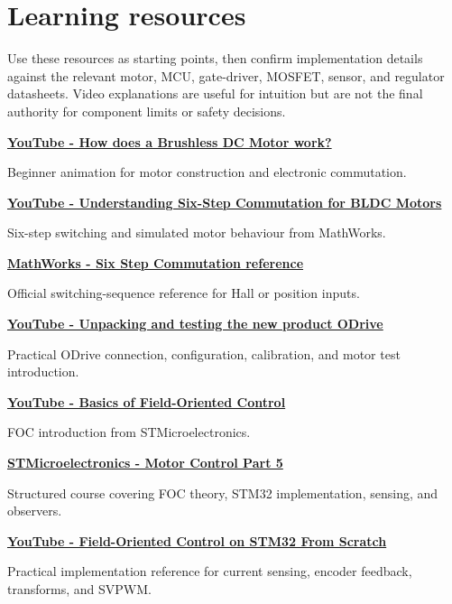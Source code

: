 \documentclass[11pt,a4paper]{article}
\newcommand{\Resource}[3]{%
  \begin{resourcebox}
    \href{#2}{\textbf{\color{DARESTeal}#1}}\par
    {\small #3}
  \end{resourcebox}
}
\begin{document}
\section{Learning resources}

Use these resources as starting points, then confirm implementation details
against the relevant motor, MCU, gate-driver, MOSFET, sensor, and regulator
datasheets. Video explanations are useful for intuition but are not the final
authority for component limits or safety decisions.

\Resource
  {YouTube - How does a Brushless DC Motor work?}
  {https://www.youtube.com/watch?v=Hw1q-jbhPzc}
  {Beginner animation for motor construction and electronic commutation.}

\Resource
  {YouTube - Understanding Six-Step Commutation for BLDC Motors}
  {https://www.youtube.com/watch?v=WYJWdMV3YMs}
  {Six-step switching and simulated motor behaviour from MathWorks.}

\Resource
  {MathWorks - Six Step Commutation reference}
  {https://www.mathworks.com/help/mcb/ref/sixstepcommutation.html}
  {Official switching-sequence reference for Hall or position inputs.}

\Resource
  {YouTube - Unpacking and testing the new product ODrive}
  {https://www.youtube.com/watch?v=DVN25PbMfDE\&list=PLc2RScfrSFEDcQp6Qvc7mBNre8ABCoz9p}
  {Practical ODrive connection, configuration, calibration, and motor test introduction.}

\Resource
  {YouTube - Basics of Field-Oriented Control}
  {https://www.youtube.com/watch?v=j0XfWufMM7s}
  {FOC introduction from STMicroelectronics.}

\Resource
  {STMicroelectronics - Motor Control Part 5}
  {https://www.st.com/content/st_com/en/support/learning/stm32-moocs/Motor-Control-Part-5-STM32-Field-Oriented-motor-control-training.html}
  {Structured course covering FOC theory, STM32 implementation, sensing, and observers.}

\Resource
  {YouTube - Field-Oriented Control on STM32 From Scratch}
  {https://www.youtube.com/watch?v=AmS22zwl2EA}
  {Practical implementation reference for current sensing, encoder feedback, transforms, and SVPWM.}
\end{document}
